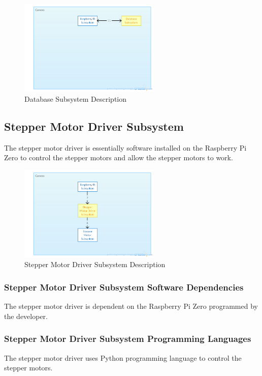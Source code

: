 \begin{figure}[h!] 
 	\centering 
  	\includegraphics[width=0.60\textwidth]{images/ADSdiagrams/databasesubsystem.png} 
 \caption{Database Subsystem Description} 
\end{figure}


\subsection{Stepper Motor Driver Subsystem}
The stepper motor driver is essentially software installed on the Raspberry Pi Zero to control the stepper motors and allow the stepper motors to work.

\begin{figure}[h!] 
 	\centering 
  	\includegraphics[width=0.60\textwidth]{images/ADSdiagrams/steppermotordriversubsystem.png} 
 \caption{Stepper Motor Driver Subsystem Description} 
\end{figure}


\subsubsection{Stepper Motor Driver Subsystem Software Dependencies}
The stepper motor driver is dependent on the Raspberry Pi Zero programmed by the developer.

\subsubsection{Stepper Motor Driver Subsystem Programming Languages}
The stepper motor driver uses Python programming language to control the stepper motors.




